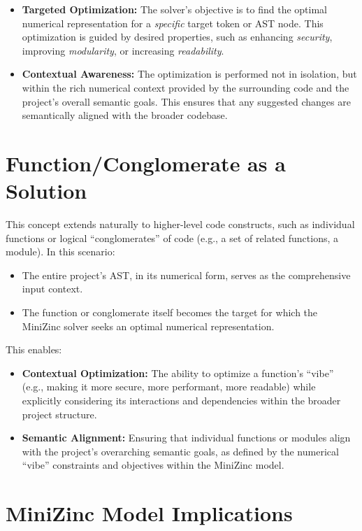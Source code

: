 \documentclass{article}
\begin{document}
\begin{itemize}
    \item \textbf{Targeted Optimization:} The solver's objective is to find the optimal numerical representation for a \textit{specific} target token or AST node. This optimization is guided by desired properties, such as enhancing \textit{security}, improving \textit{modularity}, or increasing \textit{readability}.
    \item \textbf{Contextual Awareness:} The optimization is performed not in isolation, but within the rich numerical context provided by the surrounding code and the project's overall semantic goals. This ensures that any suggested changes are semantically aligned with the broader codebase.
\end{itemize}

\section{Function/Conglomerate as a Solution}

This concept extends naturally to higher-level code constructs, such as individual functions or logical ``conglomerates'' of code (e.g., a set of related functions, a module). In this scenario:

\begin{itemize}
    \item The entire project's AST, in its numerical form, serves as the comprehensive input context.
    \item The function or conglomerate itself becomes the target for which the MiniZinc solver seeks an optimal numerical representation.
\end{itemize}

This enables:

\begin{itemize}
    \item \textbf{Contextual Optimization:} The ability to optimize a function's ``vibe'' (e.g., making it more secure, more performant, more readable) while explicitly considering its interactions and dependencies within the broader project structure.
    \item \textbf{Semantic Alignment:} Ensuring that individual functions or modules align with the project's overarching semantic goals, as defined by the numerical ``vibe'' constraints and objectives within the MiniZinc model.
\end{itemize}

\section{MiniZinc Model Implications}
\end{document}
